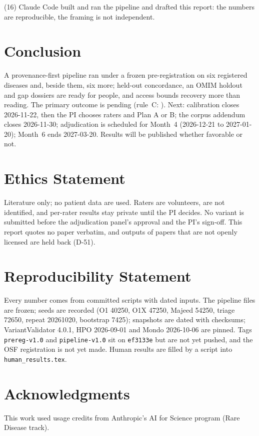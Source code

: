 \documentclass{article} %
\begin{document}
(16) Claude Code built and ran the pipeline and drafted this report: the numbers are reproducible, the framing is not independent.

\section{Conclusion}
\label{sec:conclusion}
A provenance-first pipeline ran under a frozen pre-registration on six registered diseases and, beside them, six more; held-out concordance, an OMIM holdout and gap dossiers are ready for people, and access bounds recovery more than reading. The primary outcome is pending (rule~C: ). Next: calibration closes 2026-11-22, then the PI chooses raters and Plan A or B; the corpus addendum closes 2026-11-30; adjudication is scheduled for Month~4 (2026-12-21 to 2027-01-20); Month~6 ends 2027-03-20. Results will be published whether favorable or not.

\section*{Ethics Statement}
Literature only; no patient data are used. Raters are volunteers, are not identified, and per-rater results stay private until the PI decides. No variant is submitted before the adjudication panel's approval and the PI's sign-off. This report quotes no paper verbatim, and outputs of papers that are not openly licensed are held back (D-51).

\section*{Reproducibility Statement}
Every number comes from committed scripts with dated inputs. The pipeline files are frozen; seeds are recorded (O1 40250, O1X 47250, Majeed 54250, triage 72650, repeat 20261020, bootstrap 7425); snapshots are dated with checksums; VariantValidator 4.0.1, HPO 2026-09-01 and Mondo 2026-10-06 are pinned. Tags \texttt{prereg-v1.0} and \texttt{pipeline-v1.0} sit on \texttt{ef3133e} but are not yet pushed, and the OSF registration is not yet made. Human results are filled by a script into \texttt{human\_results.tex}.

\section*{Acknowledgments}
This work used usage credits from Anthropic's AI for Science program (Rare Disease track).
\end{document}
